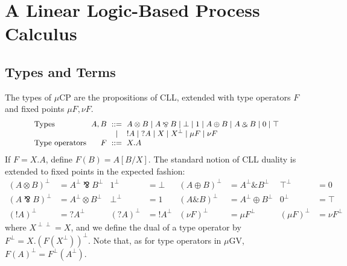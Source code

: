\documentclass[orivec,envcountsame]{llncs}
\newcommand{\with}{\mathbin\binampersand}
\newcommand{\parr}{\mathbin\bindnasrepma}
\newcommand{\cpdual}[1]{#1^\perp}
\newcommand{\cpbang}[1]{{! #1}}
\newcommand{\cpquery}[1]{{? #1}}
\newcommand{\mucp}{$\mu\mathrm{CP}$\xspace}
\newcommand{\mugv}{$\mu\mathrm{GV}$\xspace}
\begin{document}
\section{A Linear Logic-Based Process Calculus}\label{sec:mucp}

\subsection{Types and Terms}

The types of \mucp are the propositions of CLL, extended with type operators $F$ and fixed points
$\mu F,\nu F$.
\[\small\begin{array}{l@{\hspace{2mm}}r@{\hspace{2mm}}c@{\hspace{2mm}}l}
  \text{Types} & A,B & ::= & A \otimes B \mid A \parr B \mid \bot \mid 1 \mid A \oplus B \mid A \with B \mid 0 \mid \top \\
   & & \mid & \cpbang{A} \mid \cpquery{A} \mid X \mid \cpdual{X} \mid \mu F \mid \nu F \\
   \text{Type operators} & F & ::= & X.A %
\end{array}\]
If $F = X.A$, define $F(B) = A[B/X]$.  The standard notion of CLL duality is extended to fixed
points in the expected fashion:
\begin{align*}
  \cpdual{(A \otimes B)} &= \cpdual{A} \parr \cpdual{B} & \cpdual{1} &= \bot &
    \cpdual{(A \oplus B)} &= \cpdual{A} \with \cpdual{B} & \cpdual{\top} &= 0 \\
  \cpdual{(A \parr B)} &= \cpdual{A} \otimes \cpdual{B} & \cpdual{\bot} &= 1 &
    \cpdual{(A \with B)} &= \cpdual{A} \oplus \cpdual{B} & \cpdual{0} &= \top \\
  \cpdual{(\cpbang{A})} &= \cpquery{\cpdual{A}} & \cpdual{(\cpquery{A})} &= \cpbang{\cpdual{A}} &
     \cpdual{(\nu F)} &= \mu \cpdual{F} & \cpdual{(\mu F)} &= \nu \cpdual{F}
\end{align*}
where $X^{\perp\perp}  = X$, and we define the dual of a type operator by $\cpdual{F} =
X.\cpdual{(F(\cpdual{X}))}.$ Note that, as for type operators in \mugv, $\cpdual{F(A)} =
\cpdual{F}(\cpdual{A})$.
\end{document}

